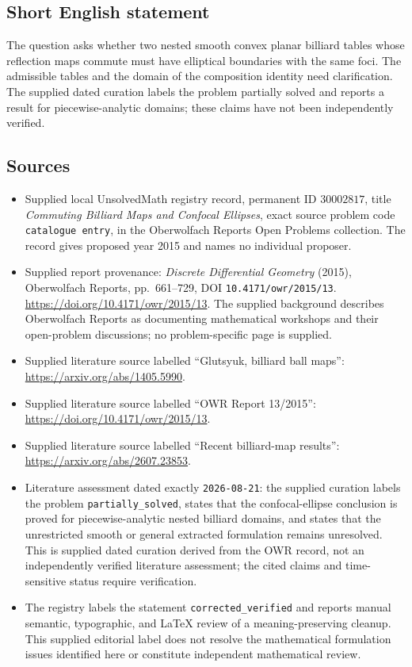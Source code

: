 \documentclass[11pt]{article}
\begin{document}
\subsection{Short English statement}
The question asks whether two nested smooth convex planar billiard tables whose reflection maps commute must have elliptical boundaries with the same foci. The admissible tables and the domain of the composition identity need clarification. The supplied dated curation labels the problem partially solved and reports a result for piecewise-analytic domains; these claims have not been independently verified.
\subsection{Sources}
\begin{itemize}
\item Supplied local UnsolvedMath registry record, permanent ID \(30002817\), title \emph{Commuting Billiard Maps and Confocal Ellipses}, exact source problem code \texttt{catalogue entry}, in the Oberwolfach Reports Open Problems collection. The record gives proposed year 2015 and names no individual proposer.
\item Supplied report provenance: \emph{Discrete Differential Geometry} (2015), Oberwolfach Reports, pp.~661--729, DOI \texttt{10.4171/owr/2015/13}. \url{https://doi.org/10.4171/owr/2015/13}. The supplied background describes Oberwolfach Reports as documenting mathematical workshops and their open-problem discussions; no problem-specific page is supplied.
\item Supplied literature source labelled ``Glutsyuk, billiard ball maps'': \url{https://arxiv.org/abs/1405.5990}.
\item Supplied literature source labelled ``OWR Report 13/2015'': \url{https://doi.org/10.4171/owr/2015/13}.
\item Supplied literature source labelled ``Recent billiard-map results'': \url{https://arxiv.org/abs/2607.23853}.
\item Literature assessment dated exactly \texttt{2026-08-21}: the supplied curation labels the problem \texttt{partially\_solved}, states that the confocal-ellipse conclusion is proved for piecewise-analytic nested billiard domains, and states that the unrestricted smooth or general extracted formulation remains unresolved. This is supplied dated curation derived from the OWR record, not an independently verified literature assessment; the cited claims and time-sensitive status require verification.
\item The registry labels the statement \texttt{corrected\_verified} and reports manual semantic, typographic, and LaTeX review of a meaning-preserving cleanup. This supplied editorial label does not resolve the mathematical formulation issues identified here or constitute independent mathematical review.
\end{itemize}
\end{document}
